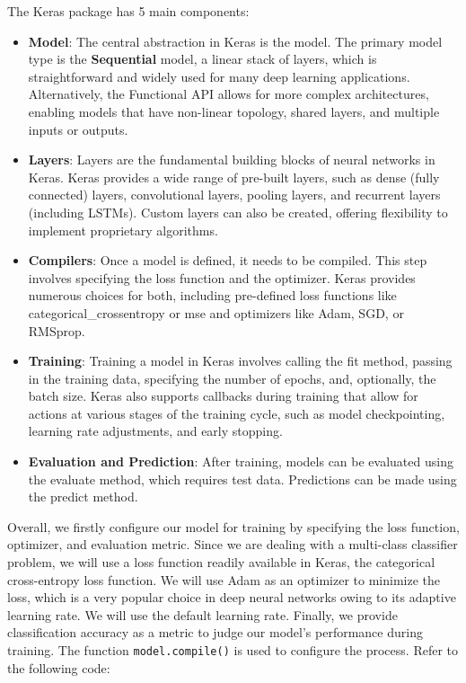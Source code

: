 The Keras package has 5 main components:
\begin{itemize}
	\item \textbf{Model}: The central abstraction in Keras is the model. The primary model type is the \textbf{Sequential} model, a linear stack of layers, which is straightforward and widely used for many deep learning applications. Alternatively, the Functional API allows for more complex architectures, enabling models that have non-linear topology, shared layers, and multiple inputs or outputs.
	\item \textbf{Layers}: Layers are the fundamental building blocks of neural networks in Keras. Keras provides a wide range of pre-built layers, such as dense (fully connected) layers, convolutional layers, pooling layers, and recurrent layers (including LSTMs). Custom layers can also be created, offering flexibility to implement proprietary algorithms.
	\item \textbf{Compilers}: Once a model is defined, it needs to be compiled. This step involves specifying the loss function and the optimizer. Keras provides numerous choices for both, including pre-defined loss functions like categorical\_crossentropy or mse and optimizers like Adam, SGD, or RMSprop.
	\item \textbf{Training}: Training a model in Keras involves calling the fit method, passing in the training data, specifying the number of epochs, and, optionally, the batch size. Keras also supports callbacks during training that allow for actions at various stages of the training cycle, such as model checkpointing, learning rate adjustments, and early stopping.
	\item \textbf{Evaluation and Prediction}: After training, models can be evaluated using the evaluate method, which requires test data. Predictions can be made using the predict method.
\end{itemize}

Overall, we firstly configure our model for training by specifying the loss function, optimizer, and evaluation metric. Since we are dealing with a multi-class classifier problem, we will use a loss function readily available in Keras, the categorical cross-entropy loss function. We will use Adam as an optimizer to minimize the loss, which is a very popular choice in deep neural networks owing to its adaptive learning rate. We will use the default learning rate. Finally, we provide classification accuracy as a metric to judge our model's performance during training. The function \texttt{model.compile()} is used to configure the process. Refer to the following code:

